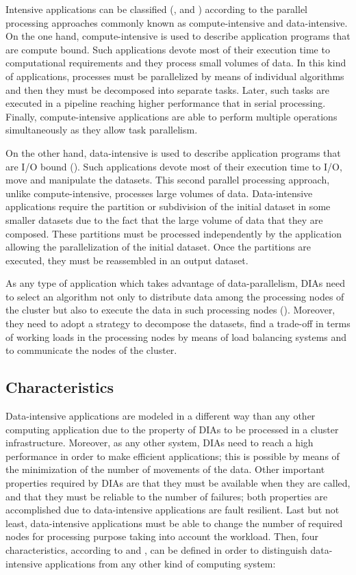 Intensive applications can be classified (\cite{parallelcomputing}, \cite{computing21} and \cite{dataintensivecomputing}) according to the parallel processing approaches commonly known as compute-intensive and data-intensive. On the one hand, compute-intensive is used to describe application programs that are compute bound. Such applications devote most of their execution time to computational requirements and they process small volumes of data. In this kind of applications, processes must be parallelized by means of individual algorithms and then they must be decomposed into separate tasks. Later, such tasks are executed in a pipeline reaching higher performance that in serial processing. Finally, compute-intensive applications are able to perform multiple operations simultaneously as they allow task parallelism.

On the other hand, data-intensive is used to describe application programs that are I/O bound (\cite{dataintensivecomputingIEEE}). Such applications devote most of their execution time to I/O, move and manipulate the datasets. This second parallel processing approach, unlike compute-intensive, processes large volumes of data. Data-intensive applications require the partition or subdivision of the initial dataset in some smaller datasets due to the fact that the large volume of data that they are composed. These partitions must be processed independently by the application allowing the parallelization of the initial dataset. Once the partitions are executed, they must be reassembled in an output dataset.

As any type of application which takes advantage of data-parallelism, DIAs need to select an algorithm not only to distribute data among the processing nodes of the cluster but also to execute the data in such processing nodes (\cite{terascalechallenge}). Moreover, they need to adopt a strategy to decompose the datasets, find a trade-off in terms of working loads in the processing nodes by means of load balancing systems and to communicate the nodes of the cluster.

\subsection{Characteristics}

Data-intensive applications are modeled in a different way than any other computing application due to the property of DIAs to be processed in a cluster infrastructure. Moreover, as any other system, DIAs need to reach a high performance in order to make efficient applications; this is possible by means of the minimization of the number of movements of the data. Other important properties required by DIAs are that they must be available when they are called, and that they must be reliable to the number of failures; both properties are accomplished due to data-intensive applications are fault resilient. Last but not least, data-intensive applications must be able to change the number of required nodes for processing purpose taking into account the workload. Then, four characteristics, according to \cite{distributedcomputing} and \cite{scalablecomputing}, can be defined in order to distinguish data-intensive applications from any other kind of computing system:

